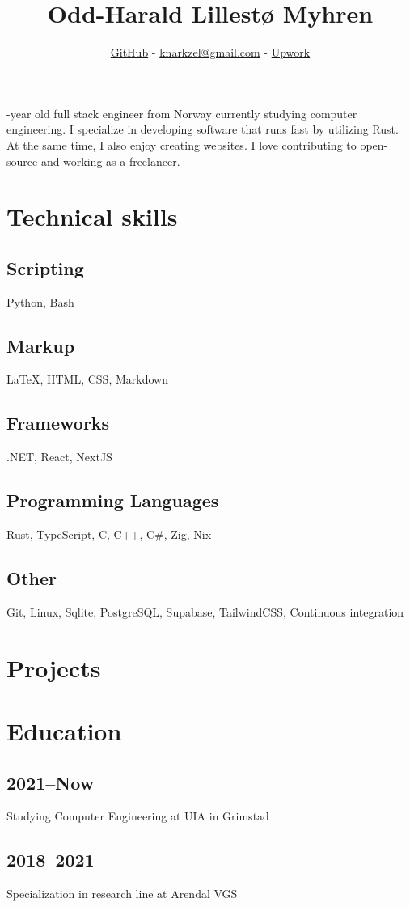 \documentclass[12pt]{article}
\renewcommand{\maketitle}{
  \begin{center}
    {\huge\bfseries\thetitle}
    
    \vspace{1em}
    
    \theauthor
  \end{center}
}
\begin{document}
\title{Odd-Harald Lillestø Myhren}
\author{\href{https://github.com/knarkzel}{GitHub} - \href{mailto:knarkzel@gmail.com}{knarkzel@gmail.com} - \href{https://www.upwork.com/freelancers/~01a292bc9be02825f6}{Upwork}}
\date{}

\maketitle

-year old full stack engineer from Norway currently studying computer engineering. I
specialize in developing software that runs fast by utilizing Rust. At the same time, I also
enjoy creating websites. I love contributing to open-source and working as a freelancer.

\section{Technical skills}

\subsection{Scripting}

Python, Bash

\subsection{Markup}

LaTeX, HTML, CSS, Markdown

\subsection{Frameworks}

.NET, React, NextJS

\subsection{Programming Languages}

Rust, TypeScript, C, C++, C\#, Zig, Nix

\subsection{Other}

Git, Linux, Sqlite, PostgreSQL, Supabase, TailwindCSS, Continuous integration

\section{Projects}

\section{Education}

\subsection{2021–Now}

Studying Computer Engineering at UIA in Grimstad

\subsection{2018–2021}

Specialization in research line at Arendal VGS
\end{document}
